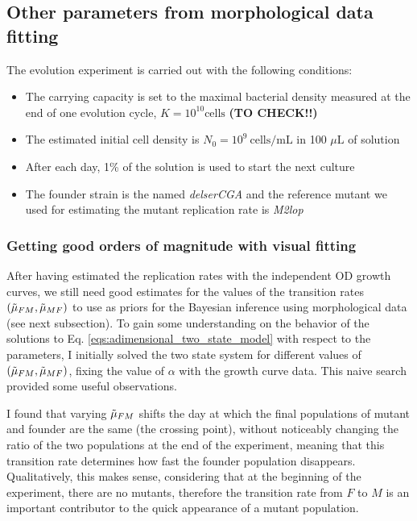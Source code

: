 \documentclass[10pt,a4paper]{scrartcl}
\begin{document}
\subsection{Other parameters from morphological data fitting}

The evolution experiment is carried out with the following conditions: 
\begin{itemize}
    \item The carrying capacity is set to the maximal bacterial density measured at the end of one evolution cycle, $K = 10^{10} \text{cells}$ \textbf{(TO CHECK!!)}
    \item The estimated initial cell density is $N_0= 10^9 \ \text{cells/mL}$ in 100 $\mu \text{L}$ of solution
    \item After each day, 1\% of the solution is used to start the next culture
    \item The founder strain is the named \textit{delserCGA} and the reference mutant we used for estimating the mutant replication rate is \textit{M2lop}
\end{itemize}

\subsubsection{Getting good orders of magnitude with visual fitting}

After having estimated the replication rates with the independent OD growth curves, we still need good estimates for the values of the transition rates $(\Tilde{\mu}_{FM}, \Tilde{\mu}_{MF})$ to use as priors for the Bayesian inference using morphological data (see next subsection).
To gain some understanding on the behavior of the solutions to Eq. \ref{eqs:adimensional_two_state_model} with respect to the parameters, I initially solved the two state system for different values of $(\Tilde{\mu}_{FM}, \Tilde{\mu}_{MF})$,  fixing the value of $\alpha$ with the growth curve data. This naive search provided some useful observations.

I found that varying $\Tilde{\mu}_{FM}$ shifts the day at which the final populations of mutant and founder are the same (the crossing point), without noticeably changing the ratio of the two populations at the end of the experiment, meaning that this transition rate determines how fast the founder population disappears. Qualitatively, this makes sense, considering that at the beginning of the experiment, there are no mutants, therefore the transition rate from $F$ to $M$ is an important contributor to the quick appearance of a mutant population.
\end{document}
